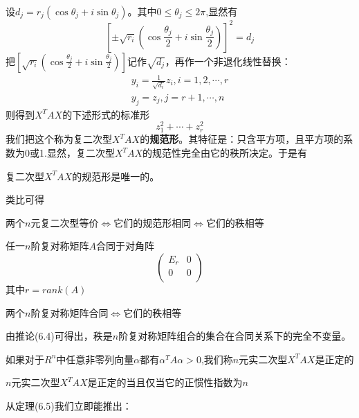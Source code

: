 \documentclass[lang=cn,10pt]{elegantbook}
\begin{document}
设$d_j=r_j\left( \cos \theta _j+i\sin \theta _j \right) $。其中$0\le\theta _j\le 2\pi$,显然有
\begin{equation*}
	\left[ \pm \sqrt{r_i}\left( \cos \frac{\theta _j}{2}+i\sin \frac{\theta _j}{2} \right) \right] ^2=d_{j}
\end{equation*}
把$\left[  \sqrt{r_i}\left( \cos \frac{\theta _j}{2}+i\sin \frac{\theta _j}{2} \right) \right]$记作$\sqrt{d_{j}}$，再作一个非退化线性替换：
\begin{equation*}
	\begin{split}
		y_{i}=\frac{1}{\sqrt{d_{i}}}z_{i},i=1,2,\cdots,r
		\\
		y_{j}=z_{j},j=r+1,\cdots,n
	\end{split}
\end{equation*}
则得到$X^{T}AX$的下述形式的标准形
\begin{equation}
	z^{2}_{1}+\cdots+z^{2}_{r}
\end{equation}
我们把这个称为复二次型$X^{T}AX$的\textbf{规范形}。其特征是：只含平方项，且平方项的系数为0或1.显然，复二次型$X^{T}AX$的规范性完全由它的秩所决定。于是有
\begin{theorem}
	复二次型$X^{T}AX$的规范形是唯一的。
\end{theorem}
类比可得
\begin{proposition}
	两个$n$元复二次型等价$\Longleftrightarrow $它们的规范形相同$\Longleftrightarrow $它们的秩相等
\end{proposition}
\begin{corollary}
	任一$n$阶复对称矩阵$A$合同于对角阵
	\begin{equation*}
		\left( \begin{matrix}
			E_r&		0\\
			0&		0\\
		\end{matrix} \right) 
	\end{equation*}
	其中$r=rank(A)$
\end{corollary}
\begin{corollary}
	两个$n$阶复对称矩阵合同$\Longleftrightarrow $它们的秩相等
\end{corollary}

由推论(6.4)可得出，秩是$n$阶复对称矩阵组合的集合在合同关系下的完全不变量。


\begin{definition}
	如果对于$R^{n}$中任意非零列向量$\alpha$都有$\alpha^{T}A\alpha>0$,我们称$n$元实二次型$X^{T}AX$是正定的
\end{definition}
\begin{theorem}
	$n$元实二次型$X^{T}AX$是正定的当且仅当它的正惯性指数为$n$
\end{theorem}
从定理(6.5)我们立即能推出：
\end{document}
